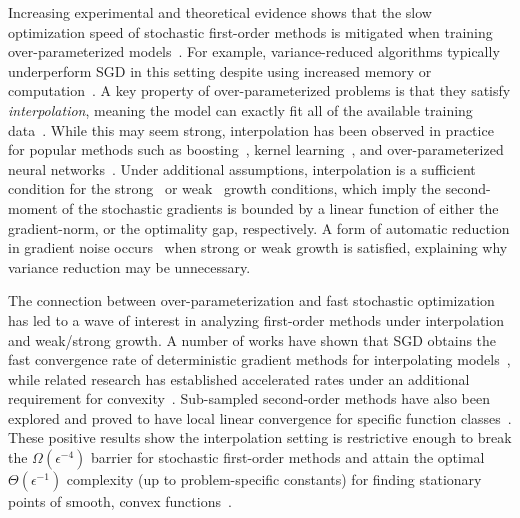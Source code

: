 Increasing experimental and theoretical evidence shows that the slow optimization speed of stochastic first-order methods is mitigated when training over-parameterized models~\citep{ma2018power, arora2018overparameterization, zhou2019analysis}.
For example, variance-reduced algorithms typically underperform \ac{SGD} in this setting despite using increased memory or computation~\citep{defazio2019effectiveness, ma2018power}. 
A key property of over-parameterized problems is that they satisfy \emph{interpolation}, meaning the model can exactly fit all of the available training data~\citep{belkin2019datainterp}.
While this may seem strong, interpolation has been observed in practice for popular methods such as boosting~\citep{schapire1997boosting}, kernel learning~\citep{belkin2019datainterp}, and over-parameterized neural networks~\citep{belkin2019reconciling, zhang2013gradient}. 
Under additional assumptions, interpolation is a sufficient condition for the strong~\citep{solodov1998incremental, tseng1998incremental, schmidt2013fast} or weak~\citep{vaswani2019fast, bassily2018exponential} growth conditions, which imply the second-moment of the stochastic gradients is bounded by a linear function of either the gradient-norm, or the optimality gap, respectively.
A form of automatic reduction in gradient noise occurs~\citep{liu2020accelerating} when strong or weak growth is satisfied, explaining why variance reduction may be unnecessary. 

The connection between over-parameterization and fast stochastic optimization has led to a wave of interest in analyzing first-order methods under interpolation and weak/strong growth.
A number of works have shown that \ac{SGD} obtains the fast convergence rate of deterministic gradient methods for interpolating models~\citep{schmidt2013fast, bassily2018exponential, vaswani2019fast, cevher2018linear, jain2018accelerating}, while related research has established accelerated rates under an additional requirement for convexity~\citep{liu2020accelerating, vaswani2019fast, jain2018accelerating}.
Sub-sampled second-order methods have also been explored and proved to have local linear convergence for specific function classes~\citep{meng2020fastandfurious}.
These positive results show the interpolation setting is restrictive enough to break the \( \Omega(\epsilon^{-4}) \) barrier for stochastic first-order methods and attain the optimal \( \Theta(\epsilon^{-1}) \) complexity (up to problem-specific constants) for finding stationary points of smooth, convex functions~\citep{nemirovsky1985optimal, arjevani2016iteration}. 

